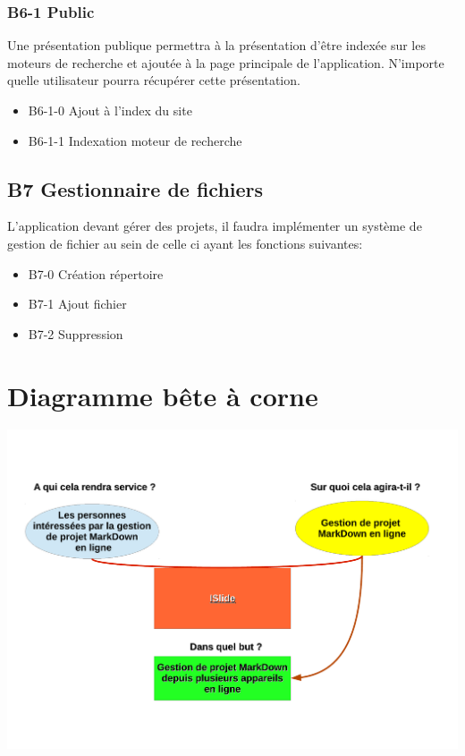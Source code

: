 \documentclass[11pt,a4paper]{article}
\begin{document}
\subsubsection{B6-1 Public}
Une présentation publique permettra à la présentation d'être indexée sur les moteurs de recherche et ajoutée à la page principale de l'application. N'importe quelle utilisateur pourra récupérer cette présentation.

\begin{itemize}
\item B6-1-0 Ajout à l'index du site
\item B6-1-1 Indexation moteur de recherche
\end{itemize}

\subsection{B7 Gestionnaire de fichiers}
L'application devant gérer des projets, il faudra implémenter un système de gestion de fichier au sein de celle ci ayant les fonctions suivantes:
\begin{itemize}
\item B7-0 Création répertoire
\item B7-1 Ajout fichier
\item B7-2 Suppression
\end{itemize}



\section{Diagramme bête à corne}

\includegraphics[scale=0.5]{bete-a-corne.pdf}
\end{document}

